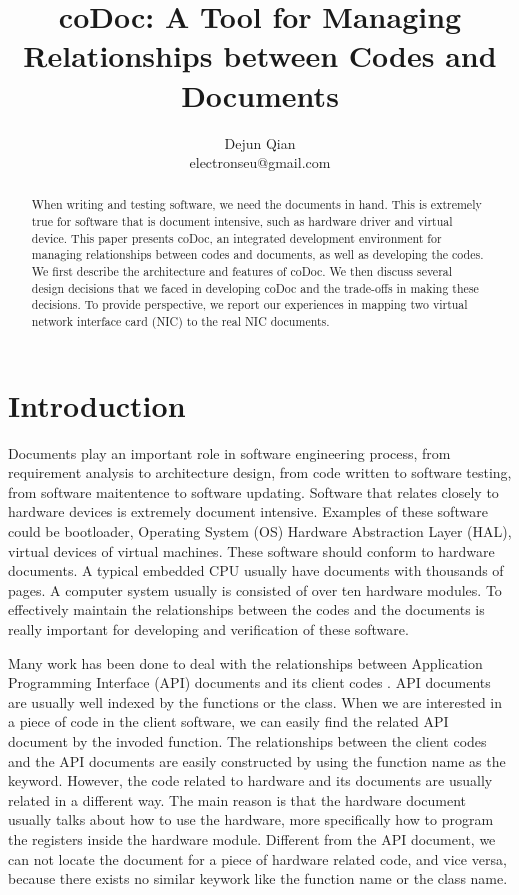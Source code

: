 \documentclass[11pt,letterpaper,oneside]{article}
\title{coDoc: A Tool for Managing Relationships between Codes and Documents}
\author{Dejun Qian\\electronseu@gmail.com}
\date{}
\begin{document}
\maketitle

\begin{abstract}
When writing and testing software, 
we need the documents in hand.
This is extremely true for software that is document intensive, 
such as hardware driver and virtual device.
This paper presents coDoc, 
an integrated development environment for managing relationships between codes and documents, as well as developing the codes. 
We first describe the architecture and features of coDoc.
We then discuss several design decisions that we faced in developing coDoc and the trade-offs in making these decisions.
To provide perspective,
we report our experiences in mapping two virtual network interface card (NIC) to the real NIC documents.
\end{abstract}

\section{Introduction}
\label{sec:introduction}
Documents play an important role in software engineering process,
from requirement analysis to architecture design,
from code written to software testing,
from software maitentence to software updating.
Software that relates closely to hardware devices is extremely document intensive.
Examples of these software could be bootloader, 
Operating System (OS) Hardware Abstraction Layer (HAL),
virtual devices of virtual machines.
These software should conform to hardware documents.
A typical embedded CPU usually have documents with thousands of pages.
A computer system usually is consisted of over ten hardware modules.
To effectively maintain the relationships between the codes and the documents is really important for developing and verification of these software.

Many work has been done to deal with the relationships between Application Programming Interface (API) documents and its client codes \cite{Pandita_inferring_2012}.
API documents are usually well indexed by the functions or the class.
When we are interested in a piece of code in the client software,
we can easily find the related API document by the invoded function.
The relationships between the client codes and the API documents are easily constructed by using the function name as the keyword.
However, the code related to hardware and its documents are usually related in a different way.
The main reason is that the hardware document usually talks about how to use the hardware,
more specifically how to program the registers inside the hardware module.
Different from the API document,
we can not locate the document for a piece of hardware related code, and vice versa,
because there exists no similar keywork like the function name or the class name.
\end{document}
